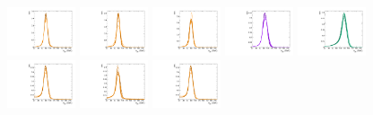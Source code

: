 \begin{figure}[htbp]
  \centering
  \includegraphics[width=0.18\textwidth]{fig/analysis/templateSignalVsMX_fromDC_GbuToWW_MJJ_mu_HP_bb_DEtaLo.pdf}
  \includegraphics[width=0.18\textwidth]{fig/analysis/templateSignalVsMX_fromDC_RadToWW_MJJ_mu_HP_bb_DEtaLo.pdf}
  \includegraphics[width=0.18\textwidth]{fig/analysis/templateSignalVsMX_fromDC_ZprToWW_MJJ_mu_HP_bb_DEtaLo.pdf}
  \includegraphics[width=0.18\textwidth]{fig/analysis/templateSignalVsMX_fromDC_WprToWZ_MJJ_mu_HP_bb_DEtaLo.pdf}
  \includegraphics[width=0.18\textwidth]{fig/analysis/templateSignalVsMX_fromDC_WprToWH_MJJ_mu_HP_bb_DEtaLo.pdf}\\
  \includegraphics[width=0.18\textwidth]{fig/analysis/templateSignalVsMX_fromDC_GbuToWW_MJJ_mu_LP_bb_DEtaLo.pdf}
  \includegraphics[width=0.18\textwidth]{fig/analysis/templateSignalVsMX_fromDC_RadToWW_MJJ_mu_LP_bb_DEtaLo.pdf}
  \includegraphics[width=0.18\textwidth]{fig/analysis/templateSignalVsMX_fromDC_ZprToWW_MJJ_mu_LP_bb_DEtaLo.pdf}

\end{figure}
